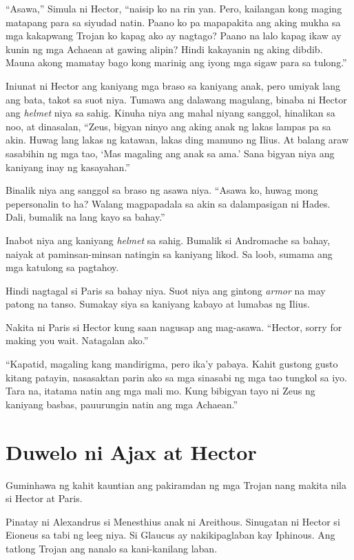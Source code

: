 \documentclass[12pt,letterpaper]{report}
\begin{document}
``Asawa,'' Simula ni Hector, ``naisip ko na rin yan. Pero, kailangan kong maging matapang para sa siyudad natin. Paano ko pa mapapakita ang aking mukha sa mga kakapwang Trojan ko kapag ako ay nagtago? Paano na lalo kapag ikaw ay kunin ng mga Achaean at gawing alipin? Hindi kakayanin ng aking dibdib. Mauna akong mamatay bago kong marinig ang iyong mga sigaw para sa tulong.''

Iniunat ni Hector ang kaniyang mga braso sa kaniyang anak, pero umiyak lang ang bata, takot sa suot niya. Tumawa ang dalawang magulang, binaba ni Hector ang \textit{helmet} niya sa sahig. Kinuha niya ang mahal niyang sanggol, hinalikan sa noo, at dinasalan, ``Zeus, bigyan ninyo ang aking anak ng lakas lampas pa sa akin. Huwag lang lakas ng katawan, lakas ding mamuno ng Ilius. At balang araw sasabihin ng mga tao, `Mas magaling ang anak sa ama.' Sana bigyan niya ang kaniyang inay ng kasayahan.''

Binalik niya ang sanggol sa braso ng asawa niya. ``Asawa ko, huwag mong pepersonalin to ha? Walang magpapadala sa akin sa dalampasigan ni Hades. Dali, bumalik na lang kayo sa bahay.''

Inabot niya ang kaniyang \textit{helmet} sa sahig. Bumalik si Andromache sa bahay, naiyak at paminsan-minsan natingin sa kaniyang likod. Sa loob, sumama ang mga katulong sa pagtahoy.

Hindi nagtagal si Paris sa bahay niya. Suot niya ang gintong \textit{armor} na may patong na tanso. Sumakay siya sa kaniyang kabayo at lumabas ng Ilius.

Nakita ni Paris si Hector kung saan nagusap ang mag-asawa. ``Hector, sorry for making you wait. Natagalan ako.''

``Kapatid, magaling kang mandirigma, pero ika'y pabaya. Kahit gustong gusto kitang patayin, nasasaktan parin ako sa mga sinasabi ng mga tao tungkol sa iyo. Tara na, itatama natin ang mga mali mo. Kung bibigyan tayo ni Zeus ng kaniyang basbas, pauurungin natin ang mga Achaean.''

\pagebreak
\chapter{Duwelo ni Ajax at Hector} %

Guminhawa ng kahit kauntian ang pakiramdan ng mga Trojan nang makita nila si Hector at Paris.

Pinatay ni Alexandrus si Menesthius anak ni Areithous. Sinugatan ni Hector si Eioneus sa tabi ng leeg niya. Si Glaucus ay nakikipaglaban kay Iphinous. Ang tatlong Trojan ang nanalo sa kani-kanilang laban.
\end{document}
